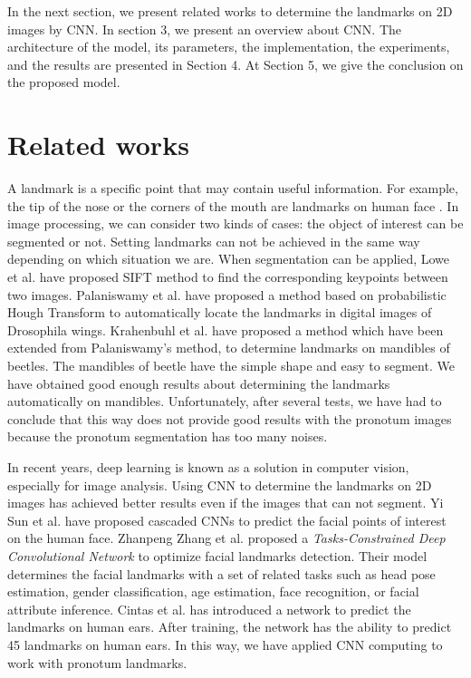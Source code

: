\documentclass[conference]{IEEEtran}
\begin{document}
In the next section, we present related works to determine the landmarks on 2D images by CNN. In section 3, we present an overview about CNN. The architecture of the model, its parameters, the implementation, the experiments, and the results are presented in Section 4. At Section 5, we give the conclusion on the proposed model.
\section{Related works}
A landmark is a specific point that may contain useful information. For example, the tip of the nose or the corners of the mouth are landmarks on human face \cite{sun2013deep}. In image processing, we can consider two kinds of cases: the object of interest can be segmented or not. Setting landmarks can not be achieved in the same way depending on which situation we are. When segmentation can be applied, Lowe et al. \cite{lowe2004distinctive} have proposed SIFT method to find the corresponding keypoints between two images. Palaniswamy et al. \cite{palaniswamy2010automatic} have proposed a method based on probabilistic Hough Transform to automatically locate the landmarks in digital images of Drosophila wings. Krahenbuhl et al. \cite{le2017maelab} have proposed a method which have been extended from Palaniswamy's method, to determine landmarks on mandibles of beetles. The mandibles of beetle have the simple shape and easy to segment. We have obtained good enough results about determining the landmarks automatically on mandibles. Unfortunately, after several tests, we have had to conclude that this way does not provide good results with the pronotum images because the pronotum segmentation has too many noises.

In recent years, deep learning is known as a solution in computer vision, especially for image analysis. Using CNN to determine the landmarks on 2D images has achieved better results even if the images that can not segment. Yi Sun et al. \cite{sun2013deep} have proposed cascaded CNNs to predict the facial points of interest on the human face.
Zhanpeng Zhang et al. \cite{zhang2014facial} proposed a \textit{Tasks-Constrained Deep Convolutional Network} to optimize facial landmarks detection. Their model determines the facial landmarks with a set of related tasks such as head pose estimation, gender classification, age estimation, face recognition, or facial attribute inference. Cintas et al. \cite{cintas2016automatic} has introduced a network to predict the landmarks on human ears. After training, the network has the ability to predict 45 landmarks on human ears. In this way, we have applied CNN computing to work with pronotum landmarks.
\end{document}
